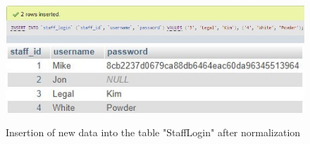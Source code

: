 \documentclass[openany]{article}
\begin{document}
		\begin{figure}[H]
			\includegraphics[width=\textwidth]{stafflogin1_insert_norm}
			\includegraphics[width=\textwidth]{stafflogin2_insert_norm}
			\caption{Insertion of new data into the table "Staff\textunderscore Login" after normalization}
		\end{figure}
\end{document}
